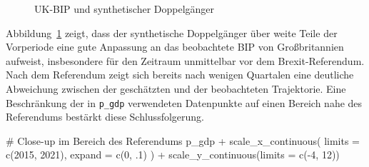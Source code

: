 \documentclass[
  a4paper,
  DIV=11,
  oneside]{scrreprt}
\newenvironment{Shaded}{\begin{snugshade}}{\end{snugshade}}
\newcommand{\AttributeTok}[1]{\textcolor[rgb]{0.40,0.45,0.13}{#1}}
\newcommand{\CommentTok}[1]{\textcolor[rgb]{0.37,0.37,0.37}{#1}}
\newcommand{\DecValTok}[1]{\textcolor[rgb]{0.68,0.00,0.00}{#1}}
\newcommand{\FunctionTok}[1]{\textcolor[rgb]{0.28,0.35,0.67}{#1}}
\newcommand{\NormalTok}[1]{\textcolor[rgb]{0.00,0.23,0.31}{#1}}
\newcommand{\SpecialCharTok}[1]{\textcolor[rgb]{0.37,0.37,0.37}{#1}}
\begin{document}
\begin{figure}[t]


\caption{\label{fig-ukuksdg}UK-BIP und synthetischer Doppelgänger}

\end{figure}%

Abbildung~\ref{fig-ukuksdg} zeigt, dass der synthetische Doppelgänger
über weite Teile der Vorperiode eine gute Anpassung an das beobachtete
BIP von Großbritannien aufweist, insbesondere für den Zeitraum
unmittelbar vor dem Brexit-Referendum. Nach dem Referendum zeigt sich
bereits nach wenigen Quartalen eine deutliche Abweichung zwischen der
geschätzten und der beobachteten Trajektorie. Eine Beschränkung der in
\texttt{p\_gdp} verwendeten Datenpunkte auf einen Bereich nahe des
Referendums bestärkt diese Schlussfolgerung.

\begin{Shaded}
\begin{Highlighting}[]
\CommentTok{\# Close{-}up im Bereich des Referendums}
\NormalTok{p\_gdp }\SpecialCharTok{+}
  \FunctionTok{scale\_x\_continuous}\NormalTok{(}
    \AttributeTok{limits =} \FunctionTok{c}\NormalTok{(}\DecValTok{2015}\NormalTok{, }\DecValTok{2021}\NormalTok{), }
    \AttributeTok{expand =} \FunctionTok{c}\NormalTok{(}\DecValTok{0}\NormalTok{, .}\DecValTok{1}\NormalTok{)}
\NormalTok{    ) }\SpecialCharTok{+}
  \FunctionTok{scale\_y\_continuous}\NormalTok{(}\AttributeTok{limits =} \FunctionTok{c}\NormalTok{(}\SpecialCharTok{{-}}\DecValTok{4}\NormalTok{, }\DecValTok{12}\NormalTok{))}
\end{Highlighting}
\end{Shaded}
\end{document}
